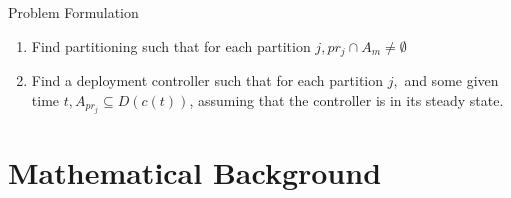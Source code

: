 \documentclass[t]{beamer}
\begin{document}
\begin{frame}[label=probformulation2]{Problem Formulation}
\begin{problem} \label{GeneralProblem}
\begin{enumerate}
\item Find partitioning such that for each partition $j, pr_{j} \cap A_m \neq \emptyset$ 
\item Find a deployment controller such that for each partition $j,$ and some given time $t, A_{pr_{j}} \subseteq D\left( c\left( t \right) \right)$, assuming that the controller is in its steady state.
\end{enumerate}
\end{problem}
\end{frame}


\section[Mathematical Background]{Mathematical Background}
\end{document}
